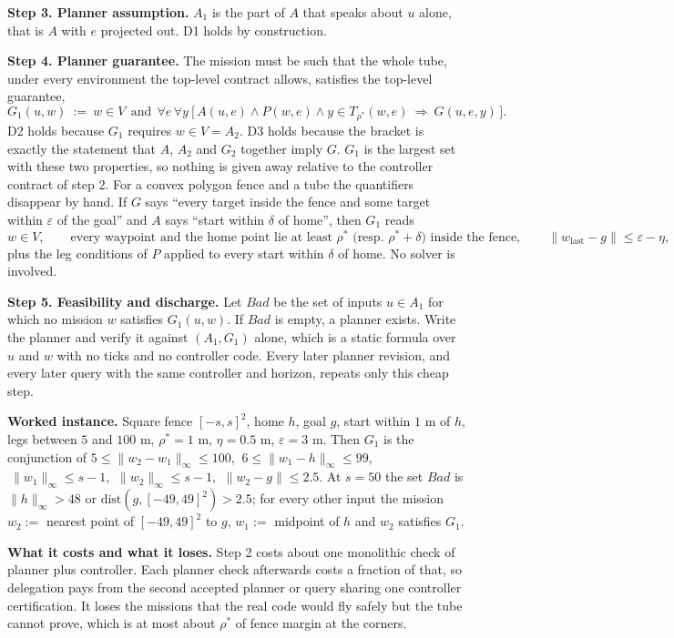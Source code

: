 \documentclass[10pt]{article}
\begin{document}
\textbf{Step 3. Planner assumption.} $A_1$ is the part of $A$ that speaks about $u$ alone, that is $A$ with $e$ projected out. D1 holds by construction.

\textbf{Step 4. Planner guarantee.} The mission must be such that the whole tube, under every environment the top-level contract allows, satisfies the top-level guarantee,
\[
G_1(u,w)\ :=\ w\in V\ \ \text{and}\ \ \forall e\,\forall y\ \bigl[\,A(u,e)\wedge P(w,e)\wedge y\in T_{\rho^*}(w,e)\ \Rightarrow\ G(u,e,y)\,\bigr].
\]
D2 holds because $G_1$ requires $w\in V=A_2$. D3 holds because the bracket is exactly the statement that $A$, $A_2$ and $G_2$ together imply $G$. $G_1$ is the largest set with these two properties, so nothing is given away relative to the controller contract of step 2. For a convex polygon fence and a tube the quantifiers disappear by hand. If $G$ says ``every target inside the fence and some target within $\varepsilon$ of the goal'' and $A$ says ``start within $\delta$ of home'', then $G_1$ reads
\[
w\in V,\qquad \text{every waypoint and the home point lie at least $\rho^*$ (resp.\ $\rho^*+\delta$) inside the fence},\qquad \|w_{\text{last}}-g\|\le\varepsilon-\eta,
\]
plus the leg conditions of $P$ applied to every start within $\delta$ of home. No solver is involved.

\textbf{Step 5. Feasibility and discharge.} Let $\mathit{Bad}$ be the set of inputs $u\in A_1$ for which no mission $w$ satisfies $G_1(u,w)$. If $\mathit{Bad}$ is empty, a planner exists. Write the planner and verify it against $(A_1,G_1)$ alone, which is a static formula over $u$ and $w$ with no ticks and no controller code. Every later planner revision, and every later query with the same controller and horizon, repeats only this cheap step.

\textbf{Worked instance.} Square fence $[-s,s]^2$, home $h$, goal $g$, start within $1$ m of $h$, legs between $5$ and $100$ m, $\rho^*=1$ m, $\eta=0.5$ m, $\varepsilon=3$ m. Then $G_1$ is the conjunction of $5\le\|w_2-w_1\|_\infty\le100$, $\ 6\le\|w_1-h\|_\infty\le99$, $\ \|w_1\|_\infty\le s-1$, $\ \|w_2\|_\infty\le s-1$, $\ \|w_2-g\|\le2.5$. At $s=50$ the set $\mathit{Bad}$ is $\|h\|_\infty>48$ or $\mathrm{dist}(g,[-49,49]^2)>2.5$; for every other input the mission $w_2:=$ nearest point of $[-49,49]^2$ to $g$, $w_1:=$ midpoint of $h$ and $w_2$ satisfies $G_1$.

\textbf{What it costs and what it loses.} Step 2 costs about one monolithic check of planner plus controller. Each planner check afterwards costs a fraction of that, so delegation pays from the second accepted planner or query sharing one controller certification. It loses the missions that the real code would fly safely but the tube cannot prove, which is at most about $\rho^*$ of fence margin at the corners.
\end{document}

